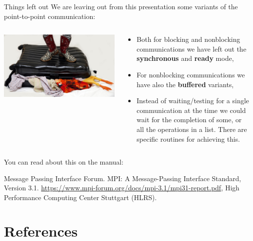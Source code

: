 \documentclass[xcolor={svgnames,usenames}]{beamer}
\begin{document}
\begin{frame}{Things left out}
We are leaving out from this presentation some variants of the point-to-point communication:
\begin{columns}
\begin{column}{0.4\columnwidth}
\centering
\includegraphics[width=\columnwidth]{fullsuitcase.jpg}
\end{column}
\begin{column}{0.6\columnwidth}
\begin{itemize}
\item Both for blocking and nonblocking communications we have left out the \textbf{synchronous} and \textbf{ready} mode,
\item For nonblocking communications we have also the \textbf{buffered} variants,
\item Instead of waiting/testing for a single communication at the time we could wait for the completion of some, or all the operations
in a list. There are specific routines for achieving this.
\end{itemize}
\end{column}

\end{columns}
\vfill
You can read about this on the manual:
\begin{thebibliography}{10}
  \footnotesize Message Passing Interface Forum. MPI: A Message-Passing Interface Standard, Version 3.1. \url{https://www.mpi-forum.org/docs/mpi-3.1/mpi31-report.pdf}, High Performance Computing Center Stuttgart (HLRS).
\end{thebibliography}


\end{frame}

\section{References}
\end{document}
